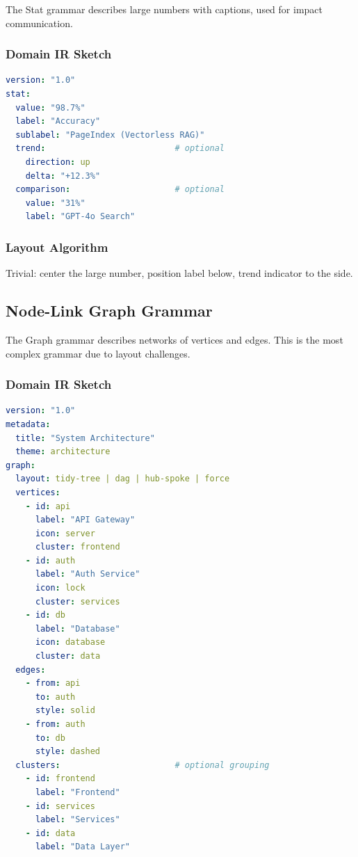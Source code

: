 The Stat grammar describes large numbers with captions, used for impact communication.

\subsubsection{Domain IR Sketch}

\begin{lstlisting}[language=yaml,caption={Stat Callout Domain IR (sketch)}]
version: "1.0"
stat:
  value: "98.7%"
  label: "Accuracy"
  sublabel: "PageIndex (Vectorless RAG)"
  trend:                          # optional
    direction: up
    delta: "+12.3%"
  comparison:                     # optional
    value: "31%"
    label: "GPT-4o Search"
\end{lstlisting}

\subsubsection{Layout Algorithm}

Trivial: center the large number, position label below, trend indicator to the side.

\subsection{Node-Link Graph Grammar}
\label{sec:graph-grammar}

The Graph grammar describes networks of vertices and edges. This is the most complex grammar due to layout challenges.

\subsubsection{Domain IR Sketch}

\begin{lstlisting}[language=yaml,caption={Node-Link Graph Domain IR (sketch)}]
version: "1.0"
metadata:
  title: "System Architecture"
  theme: architecture
graph:
  layout: tidy-tree | dag | hub-spoke | force
  vertices:
    - id: api
      label: "API Gateway"
      icon: server
      cluster: frontend
    - id: auth
      label: "Auth Service"
      icon: lock
      cluster: services
    - id: db
      label: "Database"
      icon: database
      cluster: data
  edges:
    - from: api
      to: auth
      style: solid
    - from: auth
      to: db
      style: dashed
  clusters:                       # optional grouping
    - id: frontend
      label: "Frontend"
    - id: services
      label: "Services"
    - id: data
      label: "Data Layer"
\end{lstlisting}

